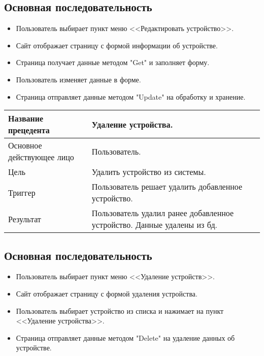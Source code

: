 \subsection{Основная последовательность}
\begin{itemize}
    \item Пользователь выбирает пункт меню <<Редактировать устройство>>.
    \item Сайт отображает страницу с формой информации об устройстве.
    \item Страница получает данные методом "Get" и заполняет форму. 
    \item Пользователь изменяет данные в форме.
    \item Страница отправляет данные методом "Update" на обработку и хранение. 
\end{itemize}

\begin{center}
    \begin{tabularx}{\textwidth}{|X|X|} \hline
    Название прецедента       & Удаление устройства.\\ \hline
    Основное действующее лицо & Пользователь.\\ \hline
    Цель                      & Удалить устройство из системы.\\ \hline
    Триггер                   & Пользователь решает удалить добавленное устройство.\\ \hline
    Результат                 & Пользователь удалил ранее добавленное устройство. Данные удалены из бд.\\ \hline
    \end{tabularx}
\end{center}

\subsection{Основная последовательность}
\begin{itemize}
    \item Пользователь выбирает пункт меню <<Удаление устройств>>.
    \item Сайт отображает страницу с формой удаления устройства.
    \item Пользователь выбирает устройство из списка и нажимает на пункт <<Удаление устройства>>.
    \item Страница отправляет данные методом "Delete" на удаление данных об устройстве. 
\end{itemize}

